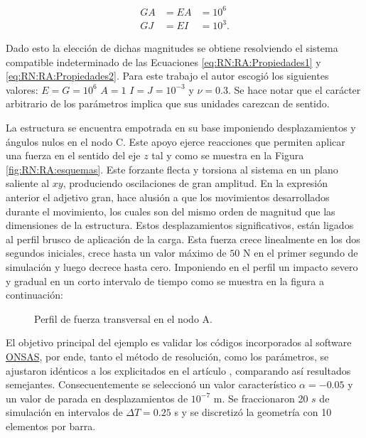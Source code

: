 \begin{eqnarray}
	\label{eq:RN:RA:Propiedades1}
	GA &= EA& =10^6\\
	\label{eq:RN:RA:Propiedades2}
	GJ &= EI& =10^3.
\end{eqnarray}

Dado esto la elección de dichas magnitudes se obtiene resolviendo el sistema compatible indeterminado de las Ecuaciones \eqref{eq:RN:RA:Propiedades1} y \eqref{eq:RN:RA:Propiedades2}. Para este trabajo el autor escogió los siguientes valores: $ E=G=10^6$ $A=1 $  $I=J=10^{-3}$ y $\nu=0.3$. Se hace notar que el carácter arbitrario de los parámetros implica que sus unidades carezcan de sentido. 


La estructura se encuentra empotrada en su base imponiendo desplazamientos y ángulos nulos en el nodo C. Este apoyo ejerce reacciones que permiten aplicar una fuerza en el sentido del eje $z$ tal y como se muestra en la Figura \ref{fig:RN:RA:esquemas}. Este forzante flecta y torsiona al sistema en un plano saliente al $xy$, produciendo oscilaciones de gran amplitud. En la expresión anterior el adjetivo gran, hace alusión a que los movimientos desarrollados durante el movimiento, los cuales son del mismo orden de magnitud que las dimensiones de la estructura. Estos desplazamientos significativos, están ligados al perfil brusco de aplicación de la carga. Esta fuerza crece linealmente en los dos segundos iniciales, crece hasta un valor máximo de $50$ N en el primer segundo de simulación y luego decrece hasta cero. Imponiendo en el perfil un impacto severo y gradual en un corto intervalo de tiempo como se muestra en la figura a continuación: 

\begin{figure}[htbp]
	\centering
	\def\svgwidth{90mm}
	
	\caption{Perfil de fuerza transversal en el nodo A.}
	\label{fig:RN:RA:Force}
\end{figure}

El objetivo principal del ejemplo es validar los códigos incorporados al software \href{https://github.com/ONSAS/ONSAS.m/}{ONSAS}, por ende, tanto el método de resolución, como los parámetros, se ajustaron idénticos a los explicitados en el artículo \citep{Le2014}, comparando así resultados semejantes. Consecuentemente se seleccionó un valor característico $\alpha=-0.05$ y un valor de parada en desplazamientos de $10^{-7}$ m. Se fraccionaron 20 $s$ de simulación en intervalos de $\Delta T=0.25$ s y se discretizó la geometría con 10 elementos por barra.


